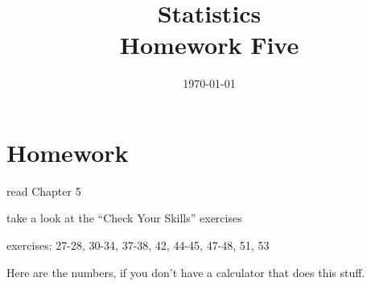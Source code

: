 \documentclass[letterpaper, landscape]{exam}
\title{Statistics \\ Homework Five}
\date{\today}
\author{}
\begin{document}
  \maketitle

  \section{Homework}
    \begin{itemize*}
      \item read Chapter 5 
      \item take a look at the ``Check Your Skills'' exercises
      \item exercises: 27-28, 30-34, 37-38, 42, 44-45, 47-48, 51, 53
    \end{itemize*}

  \ifprintanswers
  \else
    Here are the numbers, if you don't have a calculator that does this stuff.
\end{document}
